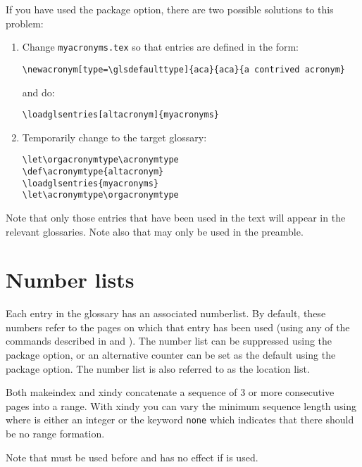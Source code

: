 \documentclass{nlctdoc}
\begin{document}
If you have used the  package option,
there are two possible solutions to this problem:
\begin{enumerate}
\item Change \texttt{myacronyms.tex} so that entries are defined in
the form:
\begin{verbatim}
\newacronym[type=\glsdefaulttype]{aca}{aca}{a contrived acronym}
\end{verbatim}
and do:
\begin{verbatim}
\loadglsentries[altacronym]{myacronyms}
\end{verbatim}

\item Temporarily change  to the target glossary:
\begin{verbatim}
\let\orgacronymtype\acronymtype
\def\acronymtype{altacronym}
\loadglsentries{myacronyms}
\let\acronymtype\orgacronymtype
\end{verbatim}
\end{enumerate}

Note that only those entries that have been used
in the text will appear in the relevant glossaries.
Note also that  may only be used in the 
preamble.

\section{Number lists}
\label{sec:numberlists}

Each entry in the glossary has an associated \gls{numberlist}.
By default, these numbers refer to the pages on which that entry has
been used (using any of the commands described in
 and ). The number
list can be suppressed using the  package
option, or an alternative counter can be set as the default using
the  package option. The number list is also
referred to as the location list.

Both \gls{makeindex} and \gls{xindy} concatenate a
sequence of 3 or more consecutive pages into a range. With 
\gls*{xindy} you can vary the minimum sequence length using
 where  is either
an integer or the keyword \texttt{none} which indicates that there
should be no range formation.

\begin{important}
Note that  must be used before
 and has no effect if  is used.
\end{important}
\end{document}
